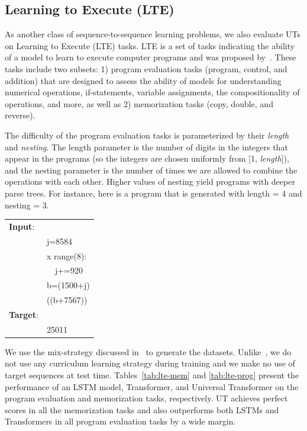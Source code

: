 

\subsection{Learning to Execute (LTE)}
As another class of sequence-to-sequence learning problems, we also evaluate UTs on Learning to Execute (LTE) tasks. 
LTE is a set of tasks indicating the ability of a model to learn to execute computer programs and was proposed by~\citet{ZS14}. These tasks include two subsets: 1) program evaluation tasks (program, control, and addition) that are designed to assess the ability of models for understanding numerical operations, if-statements, variable assignments, the compositionality of operations, and more, as well as 2) memorization tasks (copy, double, and reverse). 

The difficulty of the program evaluation tasks is parameterized by their \textit{length} and \textit{nesting}. The
length parameter is the number of digits in the integers that appear in the programs (so the integers are chosen uniformly from [1, \emph{length}]), and the nesting parameter is the number of times we are allowed to combine the operations with each
other. Higher values of nesting yield programs with deeper parse trees.
For instance, here is a program that is generated with length = 4 and
nesting = 3. 
\begin{table}[h!]
\fontsize{8}{8}\selectfont
\begin{tabular}{l l}
\textbf{Input}: & \\
& j=8584 \\
& {\color{blue}{for}} x {\color{blue}{in}} range(8): \\
& ~~j+=920 \\
& b=(1500+j) \\
& {\color{blue}{print}}((b+7567)) \\
\textbf{Target}: & \\
& 25011
\end{tabular}
\end{table}


We use the mix-strategy discussed in~\citep{ZS14} to generate the datasets. Unlike~\citep{ZS14}, we do not use any curriculum learning strategy during training and we make no use of target sequences at test time. Tables~\ref{tab:lte-mem} and \ref{tab:lte-prog} present the performance of an LSTM model, Transformer, and Universal Transformer on the program evaluation and memorization tasks, respectively. UT achieves perfect scores in all the memorization tasks and also outperforms both LSTMs and Transformers in all program evaluation tasks by a wide margin. 


